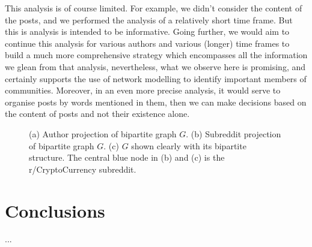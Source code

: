 \documentclass[twoside]{report}
\begin{document}
\begin{spacing}{1}
This analysis is of course limited. For example, we didn't consider the content of the posts, and we performed the analysis of a relatively short time frame. But this is analysis is intended to be informative. Going further, we would aim to continue this analysis for various authors and various (longer) time frames to build a much more comprehensive strategy which encompasses all the information we glean from that analysis, nevertheless, what we observe here is promising, and certainly supports the use of network modelling to identify important members of communities. Moreover, in an even more precise analysis, it would serve to organise posts by words mentioned in them, then we can make decisions based on the content of posts and not their existence alone.


\begin{figure}[!h]
\begin{minipage}{.5\linewidth}
\centering
{}
\end{minipage}%
\begin{minipage}{.5\linewidth}
\centering
{}
\end{minipage}\par\medskip
\centering
{}
\caption{(a) Author projection of bipartite graph $G$. (b) Subreddit projection of bipartite graph $G$. (c) $G$ shown clearly with its bipartite structure. The central blue node in (b) and (c) is the r/CryptoCurrency subreddit.}
\label{fig:bipartite}
\end{figure}



\section{Conclusions}
...











\end{spacing}
\nocite{*}
{\small


}
\end{document}

